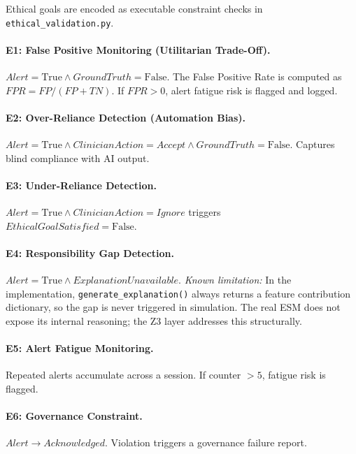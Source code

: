 \documentclass[]{UCD_CS_41820_Report}
\begin{document}
Ethical goals are encoded as executable constraint checks in
\texttt{ethical\_validation.py}.

\paragraph{E1: False Positive Monitoring (Utilitarian Trade-Off).}
$Alert = \text{True} \land GroundTruth = \text{False}$. The False Positive Rate is
computed as $FPR = FP / (FP + TN)$. If $FPR > 0$, alert fatigue risk is flagged
and logged.

\paragraph{E2: Over-Reliance Detection (Automation Bias).}
$Alert = \text{True} \land ClinicianAction = Accept \land GroundTruth = \text{False}$.
Captures blind compliance with AI output.

\paragraph{E3: Under-Reliance Detection.}
$Alert = \text{True} \land \mathit{ClinicianAction} = \mathit{Ignore}$ triggers\\
 $\mathit{EthicalGoalSatisfied} = \text{False}$.

\paragraph{E4: Responsibility Gap Detection.}
$Alert = \text{True} \land ExplanationUnavailable$. \textit{Known limitation:}
In the implementation, \texttt{generate\_explanation()} always returns a feature
contribution dictionary, so the gap is never triggered in simulation. The real ESM
does not expose its internal reasoning; the Z3 layer addresses this structurally.

\paragraph{E5: Alert Fatigue Monitoring.}
Repeated alerts accumulate across a session. If counter $> 5$, fatigue risk is
flagged.

\paragraph{E6: Governance Constraint.}
$Alert \rightarrow Acknowledged$. Violation triggers a governance failure report.
\end{document}

